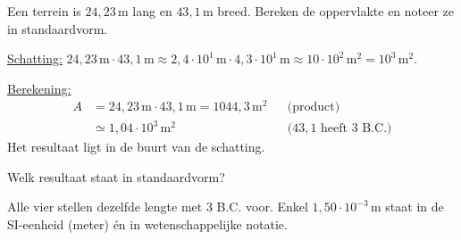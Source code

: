 \documentclass{ximera}
\begin{document}
\begin{example}[foldable=true,title={Voorbeeld: een oppervlakte in standaardvorm}]\nl
    Een terrein is $24{,}23 \, \mathrm{m}$ lang en $43{,}1 \, \mathrm{m}$ breed. Bereken de oppervlakte en noteer ze in standaardvorm.

    \begin{solution}\nl
        \underline{Schatting:} $24{,}23 \, \mathrm{m} \cdot 43{,}1 \, \mathrm{m} \approx 2{,}4 \cdot 10^{1} \, \mathrm{m} \cdot 4{,}3 \cdot 10^{1} \, \mathrm{m} \approx 10 \cdot 10^{2} \, \mathrm{m}^{2} = 10^{3} \, \mathrm{m}^{2}$.

        \underline{Berekening:}
        \begin{align*}
            A &= 24{,}23 \, \mathrm{m} \cdot 43{,}1 \, \mathrm{m} = 1044{,}3 \, \mathrm{m}^{2} && \text{(product)}\\
            &\simeq \boxed{1{,}04 \cdot 10^{3} \, \mathrm{m}^{2}} && \text{($43{,}1$ heeft 3 B.C.)}
        \end{align*}
        Het resultaat ligt in de buurt van de schatting.
    \end{solution}
\end{example}

\begin{question}
    Welk resultaat staat in standaardvorm?

    \begin{multipleChoice}
    \end{multipleChoice}

    \begin{solution}\nl
        Alle vier stellen dezelfde lengte met 3 B.C. voor. Enkel $1{,}50 \cdot 10^{-3} \, \mathrm{m}$ staat in de SI-eenheid (meter) én in wetenschappelijke notatie.
    \end{solution}
\end{question}
\end{document}
